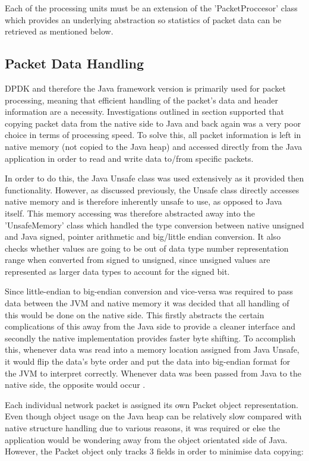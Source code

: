 \documentclass[final_report.tex]{subfiles}
\begin{document}
Each of the processing units must be an extension of the 'PacketProccesor' class which provides an underlying abstraction so statistics of packet data can be retrieved as mentioned below.

\subsection{Packet Data Handling}
DPDK and therefore the Java framework version is primarily used for packet processing, meaning that efficient handling of the packet's data and header information are a necessity. Investigations outlined in section  supported that copying packet data from the native side to Java and back again was a very poor choice in terms of processing speed. To solve this, all packet information is left in native memory (not copied to the Java heap) and accessed directly from the Java application in order to read and write data to/from specific packets.

In order to do this, the Java Unsafe class was used extensively as it provided then functionality. However, as discussed previously, the Unsafe class directly accesses native memory and is therefore inherently unsafe to use, as opposed to Java itself. This memory accessing was therefore abstracted away into the 'UnsafeMemory' class which handled the type conversion between native unsigned and Java signed, pointer arithmetic and big/little endian conversion. It also checks whether values are going to be out of data type number representation range when converted from signed to unsigned, since unsigned values are represented as larger data types to account for the signed bit.

Since little-endian to big-endian conversion and vice-versa was required to pass data between the JVM and native memory it was decided that all handling of this would be done on the native side. This firstly abstracts the certain complications of this away from the Java side to provide a cleaner interface and secondly the native implementation provides faster byte shifting. To accomplish this, whenever data was read into a memory location assigned from Java Unsafe, it would flip the data's byte order and put the data into big-endian format for the JVM to interpret correctly. Whenever data was been passed from Java to the native side, the opposite would occur .

Each individual network packet is assigned its own Packet object representation. Even though object usage on the Java heap can be relatively slow compared with native structure handling due to various reasons, it was required or else the application would be wondering away from the object orientated side of Java. However, the Packet object only tracks 3 fields in order to minimise data copying:
\end{document}
